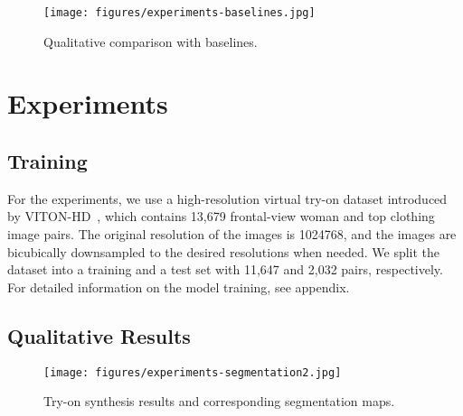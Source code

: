\begin{figure}[t!]
    \centering
    \texttt{[image: figures/experiments-baselines.jpg]}
    \vspace{-0.5cm}
    \caption{Qualitative comparison with baselines.}
    \vspace{-0.5cm}
    \label{fig:viscomp_img}
\end{figure}


\section{Experiments}

\subsection{Training}


For the experiments, we use a high-resolution virtual try-on dataset introduced by VITON-HD~\cite{choi2021viton}, which contains 13,679 frontal-view woman and top clothing image pairs.
The original resolution of the images is 1024768, and the images are bicubically downsampled to the desired resolutions when needed.
We split the dataset into a training and a test set with 11,647 and 2,032 pairs, respectively.
For detailed information on the model training, see appendix.






\subsection{Qualitative Results}


\begin{figure}[t!]
    \centering
    \texttt{[image: figures/experiments-segmentation2.jpg]}
    \caption{Try-on synthesis results and corresponding segmentation maps.}
    \label{fig:viscomp_seg}
\end{figure}






